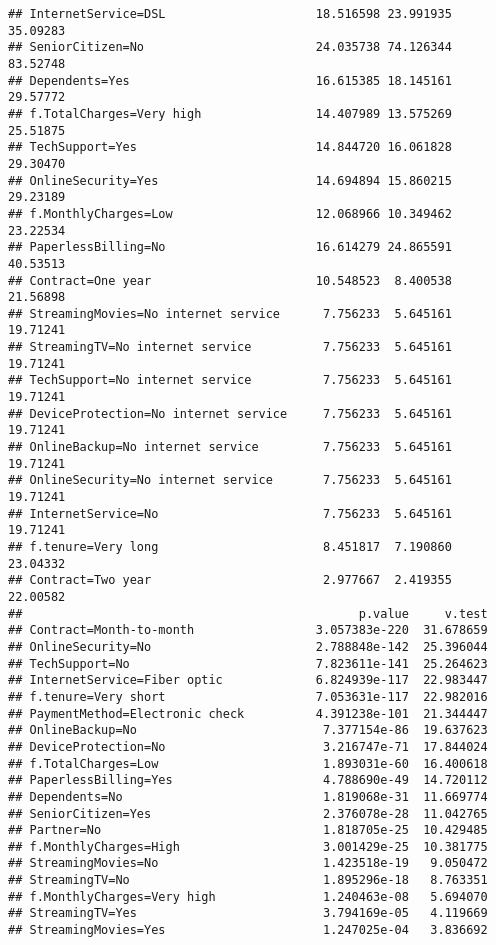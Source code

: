 \documentclass[
  a4paper]{article}
\begin{document}
\begin{verbatim}
## InternetService=DSL                     18.516598 23.991935 35.09283
## SeniorCitizen=No                        24.035738 74.126344 83.52748
## Dependents=Yes                          16.615385 18.145161 29.57772
## f.TotalCharges=Very high                14.407989 13.575269 25.51875
## TechSupport=Yes                         14.844720 16.061828 29.30470
## OnlineSecurity=Yes                      14.694894 15.860215 29.23189
## f.MonthlyCharges=Low                    12.068966 10.349462 23.22534
## PaperlessBilling=No                     16.614279 24.865591 40.53513
## Contract=One year                       10.548523  8.400538 21.56898
## StreamingMovies=No internet service      7.756233  5.645161 19.71241
## StreamingTV=No internet service          7.756233  5.645161 19.71241
## TechSupport=No internet service          7.756233  5.645161 19.71241
## DeviceProtection=No internet service     7.756233  5.645161 19.71241
## OnlineBackup=No internet service         7.756233  5.645161 19.71241
## OnlineSecurity=No internet service       7.756233  5.645161 19.71241
## InternetService=No                       7.756233  5.645161 19.71241
## f.tenure=Very long                       8.451817  7.190860 23.04332
## Contract=Two year                        2.977667  2.419355 22.00582
##                                               p.value     v.test
## Contract=Month-to-month                 3.057383e-220  31.678659
## OnlineSecurity=No                       2.788848e-142  25.396044
## TechSupport=No                          7.823611e-141  25.264623
## InternetService=Fiber optic             6.824939e-117  22.983447
## f.tenure=Very short                     7.053631e-117  22.982016
## PaymentMethod=Electronic check          4.391238e-101  21.344447
## OnlineBackup=No                          7.377154e-86  19.637623
## DeviceProtection=No                      3.216747e-71  17.844024
## f.TotalCharges=Low                       1.893031e-60  16.400618
## PaperlessBilling=Yes                     4.788690e-49  14.720112
## Dependents=No                            1.819068e-31  11.669774
## SeniorCitizen=Yes                        2.376078e-28  11.042765
## Partner=No                               1.818705e-25  10.429485
## f.MonthlyCharges=High                    3.001429e-25  10.381775
## StreamingMovies=No                       1.423518e-19   9.050472
## StreamingTV=No                           1.895296e-18   8.763351
## f.MonthlyCharges=Very high               1.240463e-08   5.694070
## StreamingTV=Yes                          3.794169e-05   4.119669
## StreamingMovies=Yes                      1.247025e-04   3.836692

\end{verbatim}
\end{document}
